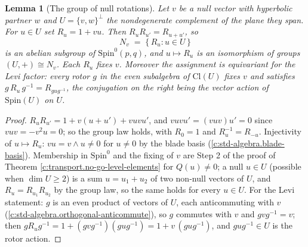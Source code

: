 \documentclass[11pt]{article}
\newtheorem{lemma}[theorem]{Lemma}
\theoremstyle{definition}
\theoremstyle{plain}
\newcommand{\changedmark}[2]{\marginpar{\raggedright\scriptsize\color{#1}#2}}
\providecommand{\Cl}{}\renewcommand{\Cl}{\mathrm{Cl}}
\providecommand{\Spin}{}\renewcommand{\Spin}{\mathrm{Spin}}
\begin{document}
\begin{lemma}[The group of null rotations]\label{c:transport.group-null-rotations}
\changedmark{BurntOrange}{changed since the deposit}
Let $v$ be a null vector with hyperbolic partner $w$ and $U = \{v, w\}^{\perp}$ the nondegenerate complement of the plane they span. For $u \in U$ set $R_u = 1 + vu$. Then $R_u R_{u'} = R_{u + u'}$, so
\[
N_v \;=\; \{\, R_u : u \in U \,\}
\]
is an abelian subgroup of $\Spin^0(p,q)$, and $u \mapsto R_u$ is an isomorphism of groups $(U, +) \cong N_v$. Each $R_u$ fixes $v$. Moreover the assignment is equivariant for the Levi factor: every rotor $g$ in the even subalgebra of $\Cl(U)$ fixes $v$ and satisfies $g\, R_u\, g^{-1} = R_{g u g^{-1}}$, the conjugation on the right being the vector action of $\Spin(U)$ on $U$.
\end{lemma}
\begin{proof}
$R_u R_{u'} = 1 + v(u + u') + vuvu'$, and $vuvu' = (vuv)u' = 0$ since $vuv = -v^2u = 0$; so the group law holds, with $R_0 = 1$ and $R_u^{-1} = R_{-u}$. Injectivity of $u \mapsto R_u$: $vu = v \wedge u \neq 0$ for $u \neq 0$ by the blade basis (\ref{c:std-algebra.blade-basis}). Membership in $\Spin^0$ and the fixing of $v$ are Step 2 of the proof of Theorem \ref{c:transport.no-go-level-elements} for $Q(u) \neq 0$; a null $u \in U$ (possible when $\dim U \geq 2$) is a sum $u = u_1 + u_2$ of two non-null vectors of $U$, and $R_u = R_{u_1}R_{u_2}$ by the group law, so the same holds for every $u \in U$. For the Levi statement: $g$ is an even product of vectors of $U$, each anticommuting with $v$ (\ref{c:std-algebra.orthogonal-anticommute}), so $g$ commutes with $v$ and $gvg^{-1} = v$; then $g R_u g^{-1} = 1 + (gvg^{-1})(gug^{-1}) = 1 + v\,(gug^{-1})$, and $gug^{-1} \in U$ is the rotor action.

\end{proof}
\end{document}
